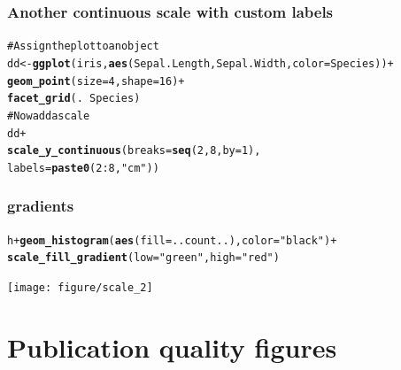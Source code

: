 \documentclass{beamer}\usepackage{graphicx, color}
\makeatletter
\newcommand{\hlfunctioncall}[1]{\textcolor[rgb]{0.501960784313725,0,0.329411764705882}{\textbf{#1}}}%
\newcommand{\hlstring}[1]{\textcolor[rgb]{0.6,0.6,1}{#1}}%
\newcommand{\hlcomment}[1]{\textcolor[rgb]{0.180392156862745,0.6,0.341176470588235}{#1}}%
\newenvironment{kframe}{%
 \def\at@end@of@kframe{}%
 \ifinner\ifhmode%
  \def\at@end@of@kframe{\end{minipage}}%
  \begin{minipage}{\columnwidth}%
 \fi\fi%
 \def\FrameCommand##1{\hskip\@totalleftmargin \hskip-\fboxsep
 \colorbox{shadecolor}{##1}\hskip-\fboxsep
     \hskip-\linewidth \hskip-\@totalleftmargin \hskip\columnwidth}%
 \MakeFramed {\advance\hsize-\width
   \@totalleftmargin\z@ \linewidth\hsize
   \@setminipage}}%
 {\par\unskip\endMakeFramed%
 \at@end@of@kframe}
\newenvironment{knitrout}{}{} %
\makeatother
\begin{document}
\begin{frame}[fragile]
\frametitle{Another continuous scale with custom labels}
\begin{knitrout}\footnotesize
{}\color{fgcolor}\begin{kframe}
\begin{alltt}
\hlcomment{# Assign the plot to an object}
dd <- \hlfunctioncall{ggplot}(iris, \hlfunctioncall{aes}(Sepal.Length, Sepal.Width, color = Species)) +
\hlfunctioncall{geom_point}(size = 4, shape = 16) +
\hlfunctioncall{facet_grid}(. ~Species)
\hlcomment{# Now add a scale}
dd +
\hlfunctioncall{scale_y_continuous}(breaks = \hlfunctioncall{seq}(2, 8, by = 1),
labels = \hlfunctioncall{paste0}(2:8, \hlstring{" cm"}))
\end{alltt}
\end{kframe}
\end{knitrout}

\end{frame}


\begin{frame}[fragile]
\frametitle{gradients}
\begin{knitrout}\footnotesize
{}\color{fgcolor}\begin{kframe}
\begin{alltt}
h + \hlfunctioncall{geom_histogram}( \hlfunctioncall{aes}(fill = ..count..), color=\hlstring{"black"}) +
\hlfunctioncall{scale_fill_gradient}(low=\hlstring{"green"}, high=\hlstring{"red"})
\end{alltt}
\end{kframe}
\texttt{[image: figure/scale\_2]} 

\end{knitrout}

\end{frame}



\section*{Publication quality figures}
\frame{\sectionpage}
\end{document}
